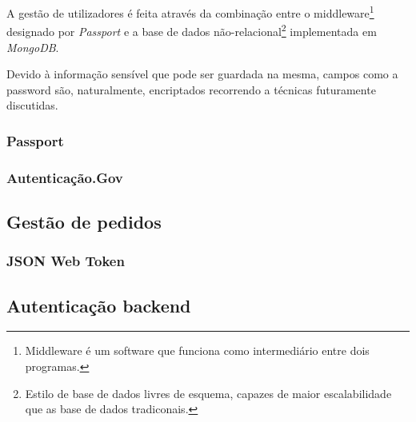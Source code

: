 A gestão de utilizadores é feita através da combinação entre o middleware\footnote{Middleware é um software que funciona como intermediário entre dois programas.} designado por \emph{Passport} e a base de dados não-relacional\footnote{Estilo de base de dados livres de esquema, capazes de maior escalabilidade que as base de dados tradiconais.} implementada em \emph{MongoDB}.

Devido à informação sensível que pode ser guardada na mesma, campos como a password são, naturalmente, encriptados recorrendo a técnicas futuramente discutidas.

\subsubsection{Passport}


\subsubsection{Autenticação.Gov}



\subsection{Gestão de pedidos}
\subsubsection{JSON Web Token}


\subsection{Autenticação backend}